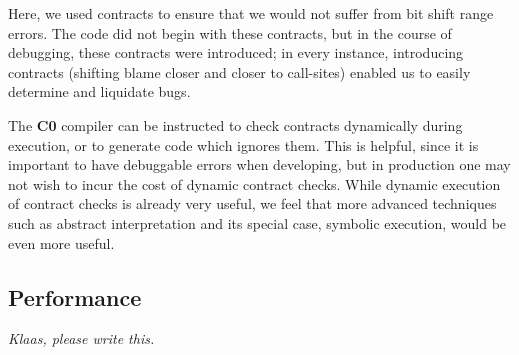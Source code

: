 \documentclass{article}
\newcommand\Kwd[1]{{\sffamily\bfseries{#1}}}
\begin{document}
Here, we used contracts to ensure that we would not suffer from bit
shift range errors. The code did not begin with these contracts, but
in the course of debugging, these contracts were introduced; in every
instance, introducing contracts (shifting blame closer and closer to
call-sites) enabled us to easily determine and liquidate bugs.

The \Kwd{C0} compiler can be instructed to check contracts dynamically
during execution, or to generate code which ignores them. This is
helpful, since it is important to have debuggable errors when
developing, but in production one may not wish to incur the cost of
dynamic contract checks. While dynamic execution of contract checks
is already very useful, we feel that more advanced techniques such as
abstract interpretation and its special case, symbolic execution,
would be even more useful.

\subsection{Performance}\label{sec:performance}

\textit{Klaas, please write this.}




\end{document}

